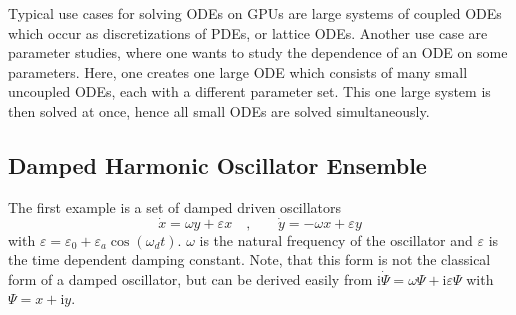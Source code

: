 \documentclass[1p]{elsarticle}
\newcommand {\ii} {\text{i}}
\begin{document}
Typical use cases for solving ODEs on GPUs are large systems of
coupled ODEs which occur as discretizations of PDEs, or lattice
ODEs. Another use case are parameter studies, where one wants to study
the dependence of an ODE on some parameters. Here, one creates one
large ODE which consists of many small uncoupled ODEs, each with a
different parameter set. This one large system is then solved at once,
hence all small ODEs are solved simultaneously.




%
%
\subsection{Damped Harmonic Oscillator Ensemble}

The first example is a set of damped driven oscillators 
\begin{equation} \label{eq:dampedsystem}
    \dot{x} = \omega y + \varepsilon x \quad \text{,} \quad \quad
    \dot{y} = -\omega x + \varepsilon y
\end{equation}
with $\varepsilon = \varepsilon_0 + \varepsilon_a \cos \left( \omega_d
t \right)$. $\omega$ is the natural frequency of the oscillator and
$\varepsilon$ is the time dependent damping constant.  Note, that this form is
not the classical form of a damped oscillator, but can be derived easily from
$\ii \dot{\Psi} = \omega \Psi + \ii \varepsilon \Psi$ with $\Psi = x + \ii y$.
\end{document}
